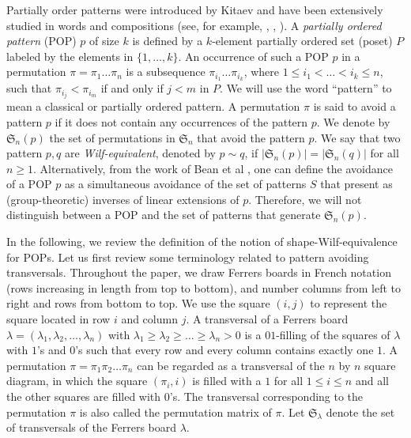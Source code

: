 \documentclass[12pt, english, a4paper]{article}
\newcommand{\SSS}{\mathfrak{S}}
\newcommand{\card}[1]{\lvert #1 \rvert}
\theoremstyle{plain}
\theoremstyle{definition}
\theoremstyle{remark}
\begin{document}
Partially order patterns were introduced by Kitaev \cite{kitaev-pop} and have been extensively studied in words and compositions (see, for example, \cite{kitaev-segmented-pop}, \cite{kitaev-mansour-pops-kary}, \cite{gao-kitaev-length-4-5-pops}).
A \emph{partially ordered pattern} (POP) $p$ of size $k$ is defined by a $k$-element partially ordered set (poset) $P$ labeled by the elements in $\{1,\dots, k\}$. An occurrence of such a POP $p$ in a permutation $\pi = \pi_1\dots\pi_n$ is a subsequence $\pi_{i_1}\dots \pi_{i_k}$, where $1 \le i_1 <\dots < i_k \le n$, such that $\pi_{i_j} < \pi_{i_m}$ if and only if $j < m$ in $P$. We will use the word ``pattern'' to mean a classical or partially ordered pattern. A permutation $\pi$ is said to avoid a pattern $p$ if it does not contain any occurrences of the pattern $p$. We denote by $\SSS_n(p)$ the set of permutations in $\SSS_n$ that avoid the pattern $p$. We say that two pattern $p,q$ are \emph{Wilf-equivalent}, denoted by $p \sim q$, if $\card{\SSS_n(p)}=\card{\SSS_n(q)}$ for all $n\ge 1$.
Alternatively, from the work of Bean et al \cite{bean-bipartite-pop}, one can define the avoidance of a POP $p$ as a simultaneous avoidance of the set of patterns $S$ that present as (group-theoretic) inverses of linear extensions of $p$. Therefore, we will not distinguish between a POP and the set of patterns that generate $\SSS_n(p)$.

In the following, we review the definition of  the notion of shape-Wilf-equivalence for POPs. Let us first review some terminology related to pattern avoiding transversals. Throughout the paper, we draw Ferrers boards in French notation (rows increasing in length from top to bottom), and number columns from left to right and rows from bottom to top. We use the square $(i,j)$ to represent the square located in row $i$ and column $j$. A transversal of a Ferrers board $\lambda= (\lambda_1,\lambda_2,\dots,\lambda_n)$ with $\lambda_1 \ge \lambda_2 \ge \dots \ge \lambda_n > 0$ is a $01$-filling of the squares of $\lambda$ with $1$'s and $0$'s such that every row and every column contains exactly one $1$. A permutation $\pi=\pi_1\pi_2\dots\pi_n$ can be regarded as a transversal of the $n$ by $n$ square diagram, in which the square $(\pi_i,i)$ is filled with a $1$ for all $1 \le i\le n$ and all the other squares are filled with $0$'s. The transversal corresponding to the permutation $\pi$ is also called the permutation matrix
of $\pi$. Let $\SSS_\lambda$ denote the set of transversals of the Ferrers board $\lambda$.
\end{document}
